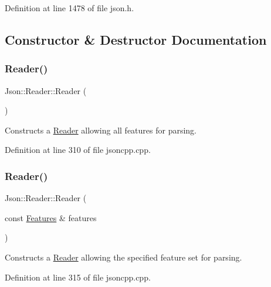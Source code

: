 Definition at line 1478 of file json.\+h.



\subsection{Constructor \& Destructor Documentation}
\hypertarget{class_json_1_1_reader_a0b3c4e24c8393354bab57a6ba3ffc27f}{}\label{class_json_1_1_reader_a0b3c4e24c8393354bab57a6ba3ffc27f} 
\subsubsection{\texorpdfstring{Reader()}{Reader()}\hspace{0.1cm}{\footnotesize\ttfamily [1/4]}}
{\footnotesize\ttfamily Json\+::\+Reader\+::\+Reader (\begin{DoxyParamCaption}{ }\end{DoxyParamCaption})}



Constructs a \hyperlink{class_json_1_1_reader}{Reader} allowing all features for parsing. 



Definition at line 310 of file jsoncpp.\+cpp.

\hypertarget{class_json_1_1_reader_a45f17831118337309180313e93ac33f8}{}\label{class_json_1_1_reader_a45f17831118337309180313e93ac33f8} 
\subsubsection{\texorpdfstring{Reader()}{Reader()}\hspace{0.1cm}{\footnotesize\ttfamily [2/4]}}
{\footnotesize\ttfamily Json\+::\+Reader\+::\+Reader (\begin{DoxyParamCaption}\item[{const \hyperlink{class_json_1_1_features}{Features} \&}]{features }\end{DoxyParamCaption})}



Constructs a \hyperlink{class_json_1_1_reader}{Reader} allowing the specified feature set for parsing. 



Definition at line 315 of file jsoncpp.\+cpp.

